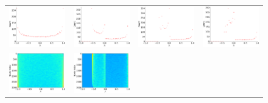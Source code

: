 \documentclass[senior,final,11pt]{iscs-thesis}
\begin{document}
\begin{figure}[htbp]
    \setlength\tabcolsep{0pt}
    \hspace{-3.0cm}
    \begin{tabular}{cccc}
      \includegraphics[width=45mm]{figure/circular_graph_3000_1.txt_dos.png} &
      \includegraphics[width=45mm]{figure/circular_graph_3000_2.txt_dos.png} &
      \includegraphics[width=45mm]{figure/circular_graph_3000_3.txt_dos.png} &
      \includegraphics[width=45mm]{figure/circular_graph_3000_4.txt_dos.png}  \\
      \includegraphics[width=45mm]{figure/circular_graph_3000_1.txt_pdos.png} &
      \includegraphics[width=45mm]{figure/circular_graph_3000_2.txt_pdos.png} &

\end{tabular}
\end{figure}
\end{document}
